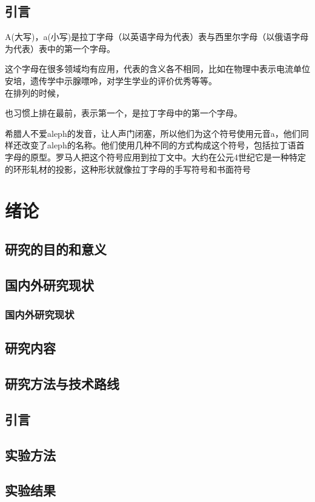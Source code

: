 \documentclass{ctexbook} %
\begin{document}
		\section{引言 }
		A(大写)，a(小写)是拉丁字母（以英语字母为代表）表与西里尔字母（以俄语字母为代表）表中的第一个字母。\par 这个字母在很多领域均有应用，代表的含义各不相同，比如在物理中表示电流单位安培，遗传学中示腺嘌呤，对学生学业的评价优秀等等。\\   在排列的时候，\par 也习惯上排在最前，表示第一个，是拉丁字母中的第一个字母。
		
		希腊人不爱aleph的发音，让人声门闭塞，所以他们为这个符号使用元音a，他们同样还改变了aleph的名称。他们使用几种不同的方式构成这个符号，包括拉丁语首字母的原型。罗马人把这个符号应用到拉丁文中。大约在公元4世纪它是一种特定的环形轧材的投影，这种形状就像拉丁字母的手写符号和书面符号
	\tableofcontents
	\chapter{绪论 }
	\section{研究的目的和意义 }
	\section{国内外研究现状}
	\subsection{国内外研究现状 }
	\section{研究内容 }
	\section{研究方法与技术路线 }
	
	
	\section{引言 }
	 
	\section{实验方法}
	
	\section{实验结果 }
\end{document}
